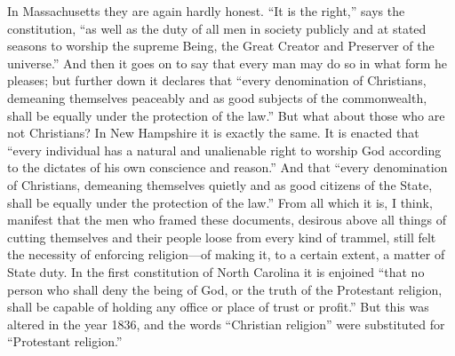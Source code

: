 In Massachusetts they are again hardly honest.  ``It is the right,''
says the constitution, ``as well as the duty of all men in society
publicly and at stated seasons to worship the supreme Being, the
Great Creator and Preserver of the universe.''  And then it goes on
to say that every man may do so in what form he pleases; but
further down it declares that ``every denomination of Christians,
demeaning themselves peaceably and as good subjects of the
commonwealth, shall be equally under the protection of the law.''
But what about those who are not Christians?  In New Hampshire it
is exactly the same.  It is enacted that ``every individual has a
natural and unalienable right to worship God according to the
dictates of his own conscience and reason.''  And that ``every
denomination of Christians, demeaning themselves quietly and as
good citizens of the State, shall be equally under the protection
of the law.''  From all which it is, I think, manifest that the men
who framed these documents, desirous above all things of cutting
themselves and their people loose from every kind of trammel, still
felt the necessity of enforcing religion---of making it, to a
certain extent, a matter of State duty.  In the first constitution
of North Carolina it is enjoined ``that no person who shall deny the
being of God, or the truth of the Protestant religion, shall be
capable of holding any office or place of trust or profit.''  But
this was altered in the year 1836, and the words ``Christian
religion'' were substituted for ``Protestant religion.''


